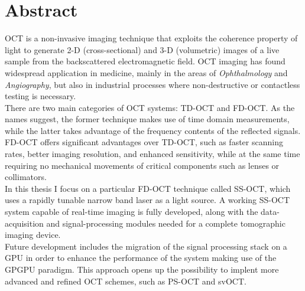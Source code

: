 \begingroup
\let\clearpage\relax
\let\cleardoublepage\relax
\let\cleardoublepage\relax

\chapter*{Abstract}
\ac{OCT} is a non-invasive imaging technique that exploits the coherence property of light to generate 2-D (cross-sectional) and 3-D (volumetric) images of a live sample from the backscattered electromagnetic field. OCT imaging has found widespread application in medicine, mainly in the areas of \emph{Ophthalmology} and \emph{Angiography}, but also in industrial processes where non-destructive or contactless testing is necessary.\\ %

\noindent There are two main categories of OCT systems: \ac{TD-OCT} and \ac{FD-OCT}. As the names suggest, the former technique makes use of time domain measurements, while the latter takes advantage of the  frequency contents of the reflected signals. FD-OCT offers significant advantages over TD-OCT, such as faster scanning rates, better imaging resolution, and enhanced sensitivity, while at the same time requiring no mechanical movements of critical components such as lenses or collimators. \\

\noindent In this thesis I focus on a particular FD-OCT technique called \ac{SS-OCT}, which uses a rapidly tunable narrow band laser as a light source. A working SS-OCT system capable of real-time imaging is fully developed, along with the data-acquisition and signal-processing modules needed for a complete tomographic imaging device. \\

\noindent Future development includes the migration of the signal processing stack on a \ac{GPU} in order to enhance the performance of the system making use of the \ac{GPGPU} paradigm. This approach opens up the possibility to implent more advanced and refined OCT schemes, such as \ac{PS-OCT} and \ac{svOCT}. 

\vfill

